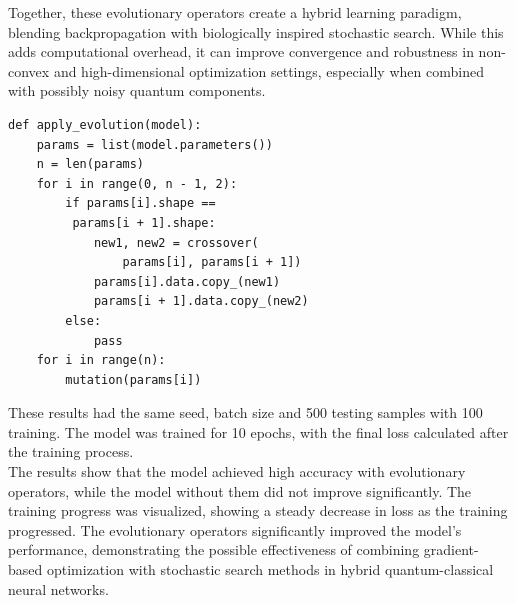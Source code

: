 \documentclass[conference]{IEEEtran}
\begin{document}
\noindent
Together, these evolutionary operators create a hybrid learning paradigm, blending backpropagation with biologically inspired stochastic search. While this adds computational overhead, it can improve convergence and robustness in non-convex and high-dimensional optimization settings, especially when combined with possibly noisy quantum components.

{\small
\begin{verbatim}
def apply_evolution(model):
    params = list(model.parameters())
    n = len(params)
    for i in range(0, n - 1, 2):
        if params[i].shape ==
         params[i + 1].shape:
            new1, new2 = crossover(
                params[i], params[i + 1])
            params[i].data.copy_(new1)
            params[i + 1].data.copy_(new2)
        else:
            pass
    for i in range(n):
        mutation(params[i])

        \end{verbatim}}




\noindent
These results had the same seed, batch size and 500 testing samples with 100 training. The model was trained for 10 epochs, with the final loss calculated after the training process.\\
The results show that the model achieved high accuracy with evolutionary operators, while the model without them did not improve significantly. The training progress was visualized, showing a steady decrease in loss as the training progressed.
The evolutionary operators significantly improved the model's performance, demonstrating the possible effectiveness of combining gradient-based optimization with stochastic search methods in hybrid quantum-classical neural networks.
\end{document}
